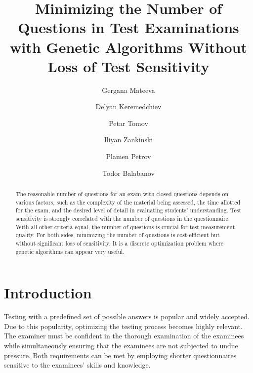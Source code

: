 \documentclass[aip,cp,amsmath,amssymb,reprint,]{revtex4-2}
\begin{document}
\title{Minimizing the Number of Questions in Test Examinations with Genetic Algorithms Without Loss of Test Sensitivity}

\author{Gergana Mateeva}
\author{Delyan Keremedchiev}
\author{Petar Tomov}
\author{Iliyan Zankinski}
\author{Plamen Petrov}
\author{Todor Balabanov}


\begin{abstract}
The reasonable number of questions for an exam with closed questions depends on various factors, such as the complexity of the material being assessed, the time allotted for the exam, and the desired level of detail in evaluating students' understanding. Test sensitivity is strongly correlated with the number of questions in the questionnaire. With all other criteria equal, the number of questions is crucial for test measurement quality. For both sides, minimizing the number of questions is cost-efficient but without significant loss of sensitivity. It is a discrete optimization problem where genetic algorithms can appear very useful.
\end{abstract}

\maketitle

\section{Introduction}

Testing with a predefined set of possible answers is popular and widely accepted. Due to this popularity, optimizing the testing process becomes highly relevant. The examiner must be confident in the thorough examination of the examinees while simultaneously ensuring that the examinees are not subjected to undue pressure. Both requirements can be met by employing shorter questionnaires sensitive to the examinees' skills and knowledge.
\end{document}
